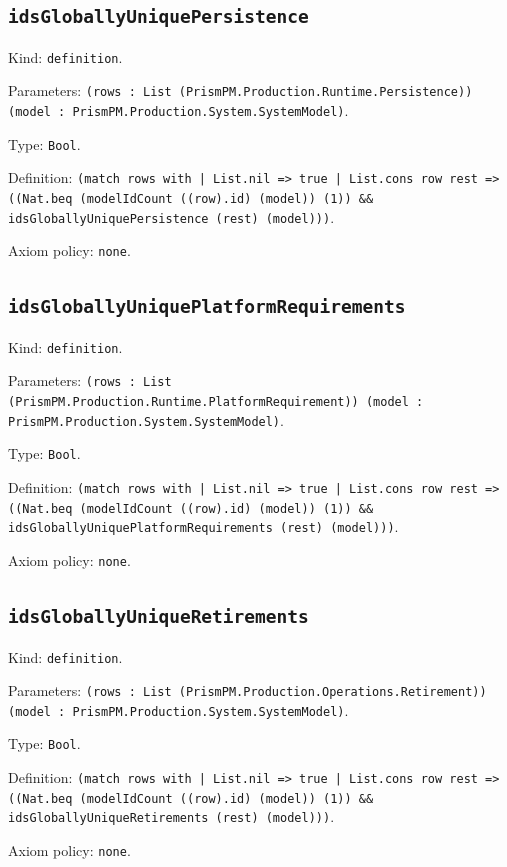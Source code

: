 \documentclass[11pt]{article}
\begin{document}
\subsection*{\texttt{idsGloballyUniquePersistence}}
\noindent Kind: \texttt{definition}.\par
\noindent Parameters: \texttt{(rows : List (PrismPM.Production.Runtime.Persistence)) (model : PrismPM.Production.System.SystemModel)}.\par
\noindent Type: \texttt{Bool}.\par
\noindent Definition: \texttt{(match rows with | List.nil => true | List.cons row rest => ((Nat.beq (modelIdCount ((row).id) (model)) (1)) \&\& idsGloballyUniquePersistence (rest) (model)))}.\par
\noindent Axiom policy: \texttt{none}.\par
\subsection*{\texttt{idsGloballyUniquePlatformRequirements}}
\noindent Kind: \texttt{definition}.\par
\noindent Parameters: \texttt{(rows : List (PrismPM.Production.Runtime.PlatformRequirement)) (model : PrismPM.Production.System.SystemModel)}.\par
\noindent Type: \texttt{Bool}.\par
\noindent Definition: \texttt{(match rows with | List.nil => true | List.cons row rest => ((Nat.beq (modelIdCount ((row).id) (model)) (1)) \&\& idsGloballyUniquePlatformRequirements (rest) (model)))}.\par
\noindent Axiom policy: \texttt{none}.\par
\subsection*{\texttt{idsGloballyUniqueRetirements}}
\noindent Kind: \texttt{definition}.\par
\noindent Parameters: \texttt{(rows : List (PrismPM.Production.Operations.Retirement)) (model : PrismPM.Production.System.SystemModel)}.\par
\noindent Type: \texttt{Bool}.\par
\noindent Definition: \texttt{(match rows with | List.nil => true | List.cons row rest => ((Nat.beq (modelIdCount ((row).id) (model)) (1)) \&\& idsGloballyUniqueRetirements (rest) (model)))}.\par
\noindent Axiom policy: \texttt{none}.\par
\end{document}
